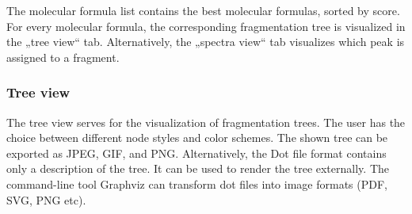 \documentclass[a4paper,11pt]{article}
\begin{document}
 
 The molecular formula list contains the best molecular formulas, sorted by score. For every molecular formula, 
 the corresponding fragmentation tree is visualized in the „tree view“ tab. Alternatively, the „spectra view“ 
 tab visualizes which peak is assigned to a fragment.
 
 \subsubsection{Tree view}
 
 The tree view serves for the visualization of fragmentation trees. 
 The user has the choice between different node styles and  color schemes. 
 The shown tree can be exported as JPEG, GIF,  and PNG. 
 Alternatively, the Dot file format contains only a description of the tree. 
 It can be used to render the tree externally. The command-line tool Graphviz can 
 transform dot files into image formats (PDF, SVG, PNG etc).
 
 
\end{document}
